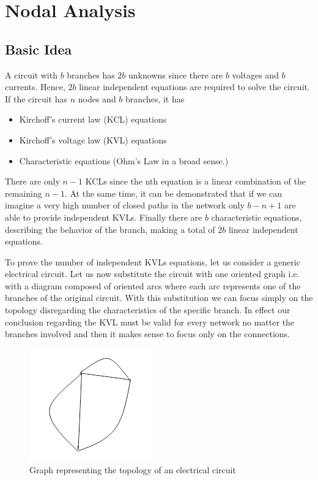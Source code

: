 \chapter{Nodal Analysis}

\section{Basic Idea}
A circuit with $b$ branches has $2b$ unknowns since there are $b$ voltages and $b$ currents. Hence, $2b$ linear independent equations are required to solve the circuit. If the circuit has $n$ nodes and $b$ branches, it has
\begin{itemize}
 \item Kirchoff's current law (KCL) equations
 \item Kirchoff's voltage law (KVL) equations
 \item Characteristic equations (Ohm's Law in a broad sense.)
\end{itemize}  
There are only $n-1$ KCLs since the nth equation is a linear combination of the remaining $n-1$. At the same time, it can be demonstrated that if we can imagine a very high number of
closed paths in the network only $b-n+1$ are able to provide independent KVLs. Finally there are $b$ characteristic equations, describing the behavior of the branch, making a total of $2b$ linear independent equations.

To prove the number of independent KVLs equations, let us consider a generic electrical circuit. Let us now substitute the circuit with one oriented graph i.e. with a diagram composed of oriented arcs where each arc represents one of the branches of the original circuit.
With this substitution we can focus simply on the topology disregarding the characteristics of the specific branch. In effect our conclusion regarding the KVL must be valid for every network no matter the branches involved and then it makes sense to focus
only on the connections.

\begin{figure}[ht]
	\centering
	\includegraphics[scale=0.6]{img/graph_representation_1.png} 
	\caption{Graph representing the topology of an electrical circuit}
	\label{fig:graph_rep_1}
\end{figure}

